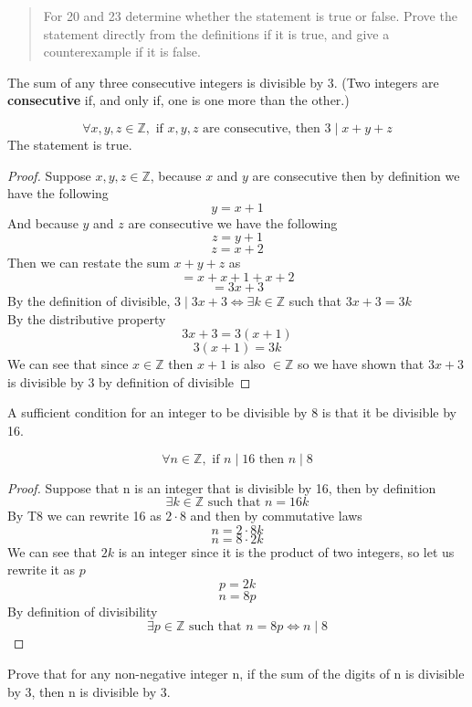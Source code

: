 \documentclass[12pt,letterpaper, onecolumn]{exam}
\begin{document}
	\begin{questions}
		\begin{quote}
			For 20 and 23 determine whether the statement is true or false. Prove the statement directly from the definitions if it is true, and give a counterexample if it is false.
		\end{quote}
		\setcounter{question}{19} \question The sum of any three consecutive integers is divisible by 3. (Two integers are \textbf{consecutive} if, and only if, one is one more than the other.)
		\begin{solution}
			$$\forall x,y,z \in \mathbb{Z}, \textrm{ if } x,y,z \textrm{ are consecutive, then } 3 \mid x+y+z$$
			The statement is true.
			\begin{proof}
				Suppose $x,y,z \in \mathbb{Z}$, because $x$ and $y$ are consecutive then by definition we have the following
				$$y=x+1$$
				And because $y$ and $z$ are consecutive we have the following
				$$z=y+1$$
				$$z=x+2$$
				Then we can restate the sum $x+y+z$ as
				$$=x+x+1+x+2$$
				$$=3x+3$$
				By the definition of divisible, $3 \mid 3x+3 \Leftrightarrow \exists k \in \mathbb{Z} $ such that $3x+3 = 3k$\\
				By the distributive property
				$$3x+3 = 3(x+1)$$
				$$3(x+1)=3k$$
				We can see that since $x\in\mathbb{Z}$ then $x+1$ is also $\in \mathbb{Z}$ so we have shown that $3x+3$ is divisible by 3 by definition of divisible
			\end{proof}
		\end{solution}
		\setcounter{question}{22} \question A sufficient condition for an integer to be divisible by 8 is that it be divisible by 16.
		\begin{solution}
			$$\forall n \in \mathbb{Z}, \textrm{ if } n \mid 16 \textrm{ then } n\mid 8$$
			\begin{proof}
				Suppose that n is an integer that is divisible by 16, then by definition
				$$\exists k \in \mathbb{Z} \textrm{ such that } n=16k$$
				By T8 we can rewrite 16 as $2 \cdot 8$ and then by commutative laws
				$$n=2\cdot8k$$
				$$n=8\cdot2k$$
				We can see that $2k$ is an integer since it is the product of two integers, so let us rewrite it as $p$
				$$p=2k$$
				$$n=8p$$
				By definition of divisibility 
				$$\exists p \in \mathbb{Z} \textrm{ such that } n=8p \Leftrightarrow n \mid 8$$
			\end{proof}
		\end{solution}
		\setcounter{question}{47} \question Prove that for any non-negative integer n, if the sum of the digits of n is divisible by 3, then n is divisible by 3.

\end{questions}
\end{document}

